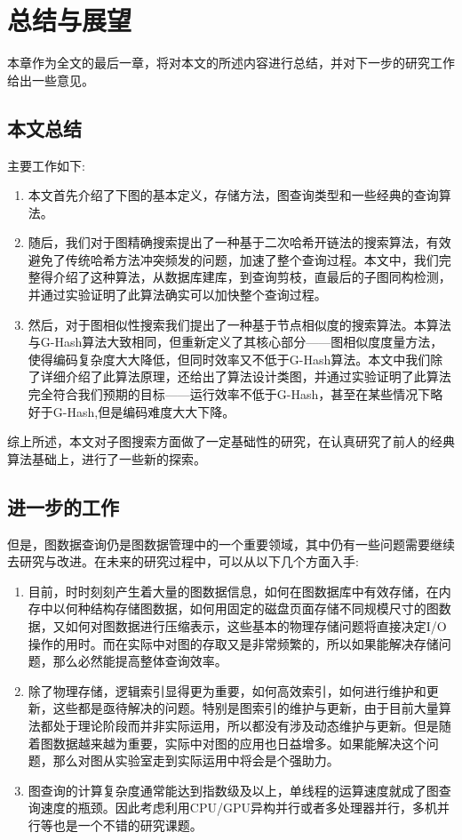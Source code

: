 \documentclass{XDBAthesis}
\begin{document}
\else
\fi
\chapter{总结与展望}
\label{chap:future}
本章作为全文的最后一章，将对本文的所述内容进行总结，并对下一步的研究工作给出一些意见。
\section{本文总结}
主要工作如下:
\begin{enumerate}
    \item 本文首先介绍了下图的基本定义，存储方法，图查询类型和一些经典的查询算法。
    \item 随后，我们对于图精确搜索提出了一种基于二次哈希开链法的搜索算法，有效避免了传统哈希方法冲突频发的问题，加速了整个查询过程。本文中，我们完整得介绍了这种算法，从数据库建库，到查询剪枝，直最后的子图同构检测，并通过实验证明了此算法确实可以加快整个查询过程。
    \item 然后，对于图相似性搜索我们提出了一种基于节点相似度的搜索算法。本算法与G-Hash算法大致相同，但重新定义了其核心部分——图相似度度量方法，使得编码复杂度大大降低，但同时效率又不低于G-Hash算法。本文中我们除了详细介绍了此算法原理，还给出了算法设计类图，并通过实验证明了此算法完全符合我们预期的目标——运行效率不低于G-Hash，甚至在某些情况下略好于G-Hash,但是编码难度大大下降。
\end{enumerate}

综上所述，本文对子图搜索方面做了一定基础性的研究，在认真研究了前人的经典算法基础上，进行了一些新的探索。
\section{进一步的工作}
但是，图数据查询仍是图数据管理中的一个重要领域，其中仍有一些问题需要继续去研究与改进。在未来的研究过程中，可以从以下几个方面入手:
\begin{enumerate}
    \item 目前，时时刻刻产生着大量的图数据信息，如何在图数据库中有效存储，在内存中以何种结构存储图数据，如何用固定的磁盘页面存储不同规模尺寸的图数据，又如何对图数据进行压缩表示，这些基本的物理存储问题将直接决定I/O操作的用时。而在实际中对图的存取又是非常频繁的，所以如果能解决存储问题，那么必然能提高整体查询效率。
    \item 除了物理存储，逻辑索引显得更为重要，如何高效索引，如何进行维护和更新，这些都是亟待解决的问题。特别是图索引的维护与更新，由于目前大量算法都处于理论阶段而并非实际运用，所以都没有涉及动态维护与更新。但是随着图数据越来越为重要，实际中对图的应用也日益增多。如果能解决这个问题，那么对图从实验室走到实际运用中将会是个强助力。
    \item 图查询的计算复杂度通常能达到指数级及以上，单线程的运算速度就成了图查询速度的瓶颈。因此考虑利用CPU/GPU异构并行或者多处理器并行，多机并行等也是一个不错的研究课题。
\end{enumerate}
\ifx\allfiles\undefined
%

\end{document}
